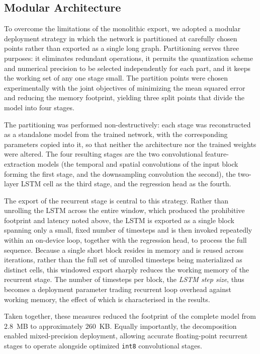 \documentclass[12pt,DIV16,BCOR12mm,a4paper,footinclude=false,headinclude,parskip=half-,twoside,openright,cleardoublepage=empty,toc=index,bibliography=totoc,listof=totoc]{scrreprt}
\numberwithin{equation}{chapter}
\begin{document}
  \subsection{Modular Architecture}
  \label{sec:model_arch_methodology}
  To overcome the limitations of the monolithic export, we adopted a modular deployment
  strategy in which the network is partitioned at carefully chosen points rather than
  exported as a single long graph. Partitioning serves three purposes: it eliminates
  redundant operations, it permits the quantization scheme and numerical precision to be
  selected independently for each part, and it keeps the working set of any one stage
  small. The partition points were chosen experimentally with the joint objectives of
  minimizing the mean squared error and reducing the memory footprint, yielding three
  split points that divide the model into four stages.

  The partitioning was performed non-destructively: each stage was reconstructed as a
  standalone model from the trained network, with the corresponding parameters copied into
  it, so that neither the architecture nor the trained weights were altered. The four
  resulting stages are the two convolutional feature-extraction models (the temporal and
  spatial convolutions of the input block forming the first stage, and the downsampling
  convolution the second), the two-layer LSTM cell as the third stage, and the regression
  head as the fourth.

  The export of the recurrent stage is central to this strategy. Rather than unrolling the
  LSTM across the entire window, which produced the prohibitive footprint and latency noted
  above, the LSTM is exported as a single block spanning only a small, fixed number of
  timesteps and is then invoked repeatedly within an on-device loop, together with the
  regression head, to process the full sequence. Because a single short block resides in
  memory and is reused across iterations, rather than the full set of unrolled timesteps
  being materialized as distinct cells, this windowed export sharply reduces the working
  memory of the recurrent stage. The number of timesteps per block, the \emph{LSTM step
  size}, thus becomes a deployment parameter trading recurrent loop overhead against working
  memory, the effect of which is characterised in the results.

  Taken together, these measures reduced the footprint of the complete model from $2.8$~MB
  to approximately $260$~KB. Equally importantly, the decomposition enabled mixed-precision
  deployment, allowing accurate floating-point recurrent stages to operate alongside
  optimized \texttt{int8} convolutional stages.
\end{document}
